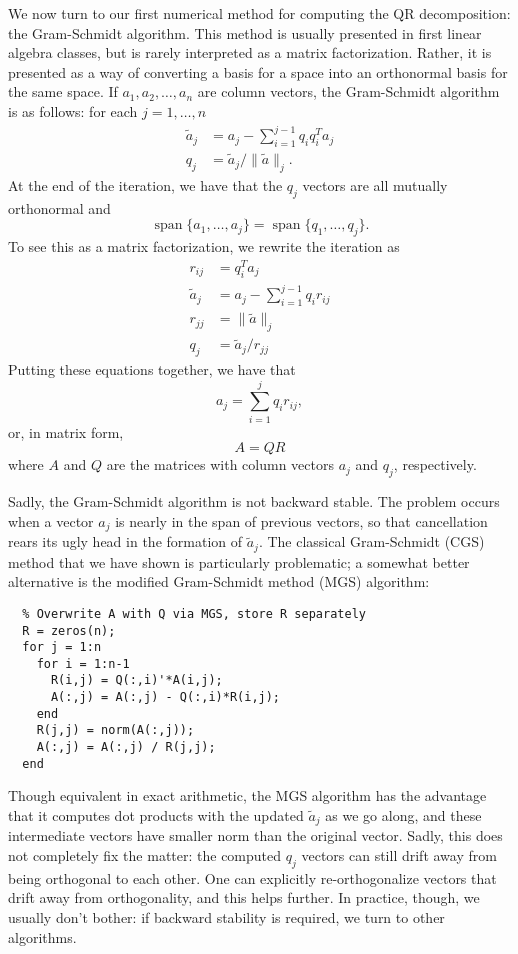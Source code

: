 \documentclass[12pt, leqno]{article} %
\begin{document}
We now turn to our first numerical method for computing the
QR decomposition: the Gram-Schmidt algorithm.  This method is
usually presented in first linear algebra classes, but is
rarely interpreted as a matrix factorization.  Rather, it is
presented as a way of converting a basis for a space into an
orthonormal basis for the same space.  If $a_1, a_2, \ldots, a_n$
are column vectors, the Gram-Schmidt algorithm is as follows:
for each $j = 1, \ldots, n$
\begin{align*}
  \tilde{a}_j &= a_j - \sum_{i=1}^{j-1} q_i q_i^T a_j \\
  q_j &= \tilde{a}_j / \|\tilde{a}\|_j.
\end{align*}
At the end of the iteration, we have that the $q_j$ vectors are
all mutually orthonormal and
\[
  \operatorname{span}\{ a_1, \ldots, a_j \} =
  \operatorname{span}\{ q_1, \ldots, q_j \}.
\]
To see this as a matrix factorization, we rewrite the iteration as
\begin{align*}
  r_{ij} &= q_i^T a_j \\
  \tilde{a}_j &= a_j - \sum_{i=1}^{j-1} q_i r_{ij} \\
  r_{jj} &= \|\tilde{a}\|_j \\
  q_j &= \tilde{a}_j / r_{jj}
\end{align*}
Putting these equations together, we have that
\[
  a_j = \sum_{i=1}^j q_i r_{ij},
\]
or, in matrix form,
\[
  A = QR
\]
where $A$ and $Q$ are the matrices with column vectors $a_j$ and $q_j$,
respectively.

Sadly, the Gram-Schmidt algorithm is not backward stable.
The problem occurs when a vector $a_j$ is nearly in the span of
previous vectors, so that cancellation rears its ugly head in the
formation of $\tilde{a}_j$.  The
classical Gram-Schmidt (CGS) method that we have shown is particularly
problematic; a somewhat better alternative is the modified Gram-Schmidt
method (MGS) algorithm:
\begin{lstlisting}
  % Overwrite A with Q via MGS, store R separately
  R = zeros(n);
  for j = 1:n
    for i = 1:n-1
      R(i,j) = Q(:,i)'*A(i,j);
      A(:,j) = A(:,j) - Q(:,i)*R(i,j);
    end
    R(j,j) = norm(A(:,j));
    A(:,j) = A(:,j) / R(j,j);
  end
\end{lstlisting}
Though equivalent in exact arithmetic, the MGS algorithm has the advantage
that it computes dot products with the updated $\tilde{a}_j$ as we go
along, and these intermediate vectors have smaller norm than the original
vector.  Sadly, this does not completely fix the matter: the computed $q_j$
vectors can still drift away from being orthogonal to each other.  One can
explicitly re-orthogonalize vectors that drift away from orthogonality,
and this helps further.  In practice, though, we usually don't bother: if
backward stability is required, we turn to other algorithms.
\end{document}
